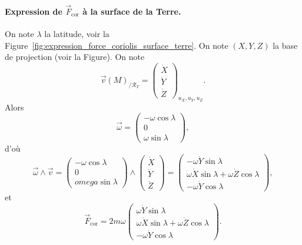             \paragraph{Expression de $\vec{F}_{\text{cor}}$ à la surface de la Terre.}

                On note $\lambda$ la latitude, voir la Figure~\ref{fig:expression_force_coriolis_surface_terre}. On note $(X,Y,Z)$ la base de projection (voir la Figure). On note 
                \begin{equation}
                    \vec{v}(M)_{/\mathcal{R}_T}=\begin{pmatrix}
                        \dot{X}\\\dot{Y}\\\dot{Z}
                    \end{pmatrix}_{u_X,u_Y,u_Z}.
                \end{equation}
                Alors
                \begin{equation}
                    \vec{\omega}=\begin{pmatrix}
                        -\omega\cos\lambda\\0\\\omega\sin\lambda
                    \end{pmatrix},
                \end{equation}
                d'où
                \begin{equation}
                    \vec{\omega}\wedge\vec{v}=\begin{pmatrix}
                        -\omega\cos\lambda\\0\\omega\sin\lambda
                    \end{pmatrix}\wedge\begin{pmatrix}
                        \dot{X}\\\dot{Y}\\\dot{Z}
                    \end{pmatrix}=\begin{pmatrix}
                        -\omega\dot{Y}\sin\lambda\\
                        \omega\dot{X}\sin\lambda+\omega\dot{Z}\cos\lambda\\
                        -\omega\dot{Y}\cos\lambda
                    \end{pmatrix},
                \end{equation}
                et
                \begin{equation}
                    \vec{F}_{\text{cor}}=2m\omega\begin{pmatrix}
                        \omega\dot{Y}\sin\lambda\\
                        \omega\dot{X}\sin\lambda+\omega\dot{Z}\cos\lambda\\
                        -\omega\dot{Y}\cos\lambda
                    \end{pmatrix}.
                \end{equation}

